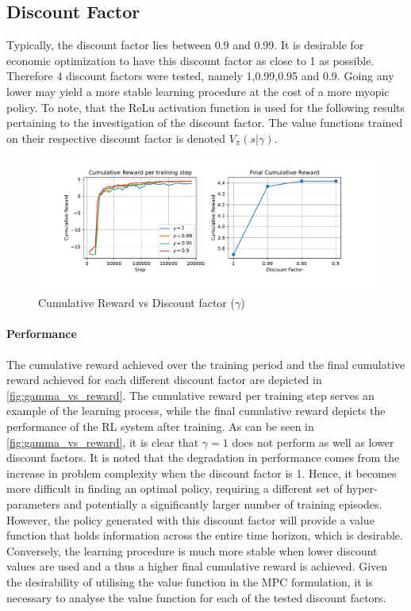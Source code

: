 \subsection{Discount Factor}
Typically, the discount factor lies between 0.9 and 0.99. It is desirable for economic optimization to have this discount factor as close to 1 as possible. Therefore 4 discount factors were tested, namely 1,0.99,0.95 and 0.9. Going any lower may yield a more stable learning procedure at the cost of a more myopic policy. To note, that the ReLu activation function is used for the following results pertaining to the investigation of the discount factor.
The value functions trained on their respective discount factor is denoted $V_\pi(s|\gamma)$.



\begin{figure}[H]
	\centering
	\includegraphics[width = \textwidth]{figures/gamma_reward.pdf}
	\caption{Cumulative Reward vs Discount factor ($\gamma$)}
	\label{fig:gamma_vs_reward}
\end{figure}

\paragraph{Performance} 
The cumulative reward achieved over the training period and the final cumulative reward achieved for each different discount factor are depicted in \autoref{fig:gamma_vs_reward}. The cumulative reward per training step serves an example of the learning process, while the final cumulative reward depicts the performance of the RL system after training. As can be seen in \autoref{fig:gamma_vs_reward}, it is clear that $\gamma = 1$ does not perform as well as lower discount factors. It is noted that the degradation in performance comes from the increase in problem complexity when the discount factor is 1. Hence, it becomes more difficult in finding an optimal policy, requiring a different set of hyper-parameters and potentially a significantly larger number of training episodes. However, the policy generated with this discount factor will provide a value function that holds information across the entire time horizon, which is desirable. Conversely, the learning procedure is much more stable when lower discount values are used and a thus a higher final cumulative reward is achieved. Given the desirability of utilising the value function in the MPC formulation, it is necessary to analyse the value function for each of the tested discount factors.\\

